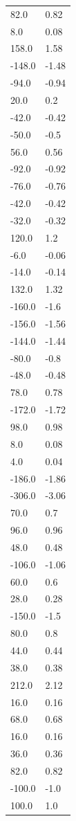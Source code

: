 \begin{longtable}{ll}
82.0 & 0.82 \\
8.0 & 0.08 \\
158.0 & 1.58 \\
-148.0 & -1.48 \\
-94.0 & -0.94 \\
20.0 & 0.2 \\
-42.0 & -0.42 \\
-50.0 & -0.5 \\
56.0 & 0.56 \\
-92.0 & -0.92 \\
-76.0 & -0.76 \\
-42.0 & -0.42 \\
-32.0 & -0.32 \\
120.0 & 1.2 \\
-6.0 & -0.06 \\
-14.0 & -0.14 \\
132.0 & 1.32 \\
-160.0 & -1.6 \\
-156.0 & -1.56 \\
-144.0 & -1.44 \\
-80.0 & -0.8 \\
-48.0 & -0.48 \\
78.0 & 0.78 \\
-172.0 & -1.72 \\
98.0 & 0.98 \\
8.0 & 0.08 \\
4.0 & 0.04 \\
-186.0 & -1.86 \\
-306.0 & -3.06 \\
70.0 & 0.7 \\
96.0 & 0.96 \\
48.0 & 0.48 \\
-106.0 & -1.06 \\
60.0 & 0.6 \\
28.0 & 0.28 \\
-150.0 & -1.5 \\
80.0 & 0.8 \\
44.0 & 0.44 \\
38.0 & 0.38 \\
212.0 & 2.12 \\
16.0 & 0.16 \\
68.0 & 0.68 \\
16.0 & 0.16 \\
36.0 & 0.36 \\
82.0 & 0.82 \\
-100.0 & -1.0 \\
100.0 & 1.0 \\

\end{longtable}
